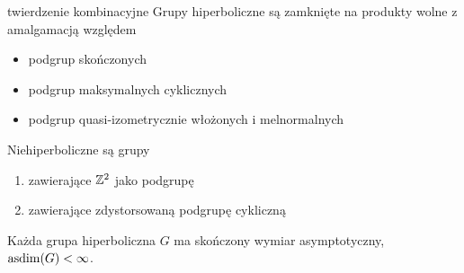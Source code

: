 \begin{fact}{twierdzenie kombinacyjne}{}
  Grupy hiperboliczne są zamknięte na produkty wolne z amalgamacją względem
  \begin{itemize}
    \item podgrup skończonych
    \item podgrup maksymalnych cyklicznych
    \item podgrup quasi-izometrycznie włożonych i melnormalnych
  \end{itemize}
\end{fact}

Niehiperboliczne są grupy 
\begin{enumerate}
  \item zawierające $\mathbb{Z}^2$ jako podgrupę
  \item zawierające zdystorsowaną podgrupę cykliczną
\end{enumerate}

\begin{fact}{}{}
  Każda grupa hiperboliczna $G$ ma skończony wymiar asymptotyczny, $\operatorname{asdim}(G)<\infty$.
\end{fact}

